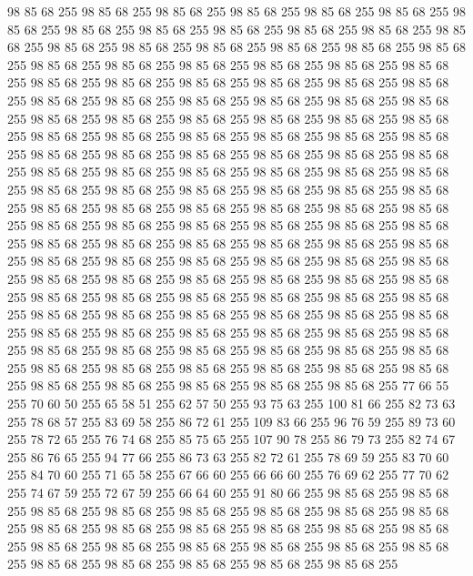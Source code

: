 98 85 68 255 98 85 68 255 98 85 68 255 98 85 68 255 98 85 68 255 98 85 68 255 98 85 68 255 98 85 68 255 98 85 68 255 98 85 68 255 98 85 68 255 98 85 68 255 98 85 68 255 98 85 68 255 98 85 68 255 98 85 68 255 98 85 68 255 98 85 68 255 98 85 68 255 98 85 68 255 98 85 68 255 98 85 68 255 98 85 68 255 98 85 68 255 98 85 68 255 98 85 68 255 98 85 68 255 98 85 68 255 98 85 68 255 98 85 68 255 98 85 68 255 98 85 68 255 98 85 68 255 98 85 68 255 98 85 68 255 98 85 68 255 98 85 68 255 98 85 68 255 98 85 68 255 98 85 68 255 98 85 68 255 98 85 68 255 98 85 68 255 98 85 68 255 98 85 68 255 98 85 68 255 98 85 68 255 98 85 68 255 98 85 68 255 98 85 68 255 98 85 68 255 98 85 68 255 98 85 68 255 98 85 68 255 98 85 68 255 98 85 68 255 98 85 68 255 98 85 68 255 98 85 68 255 98 85 68 255 98 85 68 255 98 85 68 255 98 85 68 255 98 85 68 255
98 85 68 255 98 85 68 255 98 85 68 255 98 85 68 255 98 85 68 255 98 85 68 255 98 85 68 255 98 85 68 255 98 85 68 255 98 85 68 255 98 85 68 255 98 85 68 255 98 85 68 255 98 85 68 255 98 85 68 255 98 85 68 255 98 85 68 255 98 85 68 255 98 85 68 255 98 85 68 255 98 85 68 255 98 85 68 255 98 85 68 255 98 85 68 255 98 85 68 255 98 85 68 255 98 85 68 255 98 85 68 255 98 85 68 255 98 85 68 255 98 85 68 255 98 85 68 255 98 85 68 255 98 85 68 255 98 85 68 255 98 85 68 255 98 85 68 255 98 85 68 255 98 85 68 255 98 85 68 255 98 85 68 255 98 85 68 255 98 85 68 255 98 85 68 255 98 85 68 255 98 85 68 255 98 85 68 255 98 85 68 255 98 85 68 255 98 85 68 255 98 85 68 255 98 85 68 255 98 85 68 255 98 85 68 255 98 85 68 255 98 85 68 255 98 85 68 255 98 85 68 255 98 85 68 255 98 85 68 255 98 85 68 255 98 85 68 255 98 85 68 255 98 85 68 255
98 85 68 255 98 85 68 255 98 85 68 255 98 85 68 255 77 66 55 255 70 60 50 255 65 58 51 255 62 57 50 255 93 75 63 255 100 81 66 255 82 73 63 255 78 68 57 255 83 69 58 255 86 72 61 255 109 83 66 255 96 76 59 255 89 73 60 255 78 72 65 255 76 74 68 255 85 75 65 255 107 90 78 255 86 79 73 255 82 74 67 255 86 76 65 255 94 77 66 255 86 73 63 255 82 72 61 255 78 69 59 255 83 70 60 255 84 70 60 255 71 65 58 255 67 66 60 255 66 66 60 255 76 69 62 255 77 70 62 255 74 67 59 255 72 67 59 255 66 64 60 255 91 80 66 255 98 85 68 255 98 85 68 255 98 85 68 255 98 85 68 255 98 85 68 255 98 85 68 255 98 85 68 255 98 85 68 255 98 85 68 255 98 85 68 255 98 85 68 255 98 85 68 255 98 85 68 255 98 85 68 255 98 85 68 255 98 85 68 255 98 85 68 255 98 85 68 255 98 85 68 255 98 85 68 255 98 85 68 255 98 85 68 255 98 85 68 255 98 85 68 255 98 85 68 255